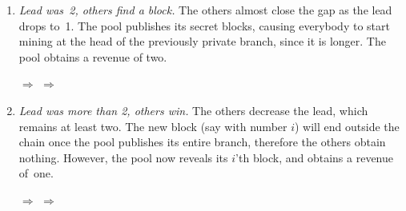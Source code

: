 \documentclass[letterpaper]{llncs}
\begin{document}
\begin{enumerate}[label=(\alph*)]
\vspace{0.5\baselineskip}

\item \emph{Lead was~2, others find a block.} The others almost close the gap as the lead drops to~1. The pool publishes its secret blocks, causing everybody to start mining at the head of the previously private branch, since it is longer. The pool obtains a revenue of two. \label{itm:others2}

\vspace{0.5\baselineskip}

\centerline{
    {\Large \hspace{0.0cm} $\Longrightarrow$ \hspace{0.0cm}}
    {\Large \hspace{0.0cm} $\Longrightarrow$ \hspace{0.0cm}}
}

\vspace{0.5\baselineskip}

\item \emph{Lead was more than 2, others win.} The others decrease the lead, which remains at least two. The new block (say with number $i$) will end outside the chain once the pool publishes its entire branch, therefore the others obtain nothing. However, the pool now reveals its $i$'th block, and obtains a revenue of~one. \label{itm:others3}

\vspace{0.5\baselineskip}

\centerline{
    {\Large \hspace{0.0cm} $\Longrightarrow$ \hspace{0.0cm}}
    {\Large \hspace{0.0cm} $\Longrightarrow$ \hspace{0.0cm}}
}

\vspace{0.5\baselineskip}

\end{enumerate} 
\end{document}
